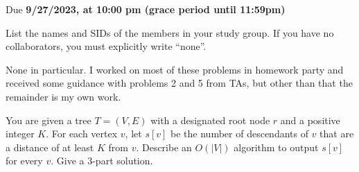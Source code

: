 \documentclass[10.5pt]{article}
\def\duedate{9/27/2023, at 10:00 pm (grace period until 11:59pm)}
\begin{document}
\maketitle


Due \textbf{\duedate}

List the names and SIDs of the members in your study group.
If you have no collaborators, you must explicitly write ``none''.

\begin{solution}
	None in particular. I worked on most of these problems in homework party and received some guidance 
	with problems 2 and 5 from TAs, but other than that the remainder is my own work.
\end{solution}

You are given a tree $T=(V, E)$ with a designated root node $r$ and a positive integer $K$. For each vertex $v$, let $s[v]$ be the number of descendants of $v$ that are a distance of at least $K$ from $v$. Describe an $O(|V|)$ algorithm to output $s[v]$ for every $v$. Give a 3-part solution.
\end{document}
